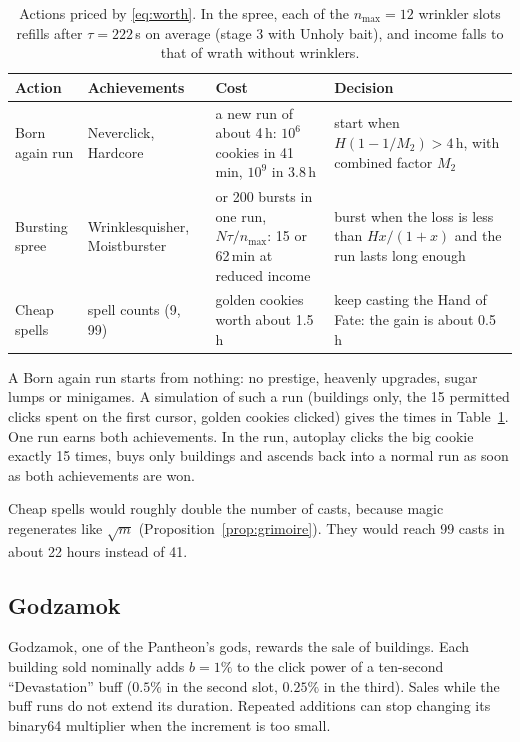 \documentclass[11pt,a4paper]{article}
\numberwithin{equation}{section}
\theoremstyle{definition}
\theoremstyle{remark}
\begin{document}
\begin{table}[t]
\centering
\small
\begin{tabular}{@{}>{\raggedright\arraybackslash}p{2.7cm}>{\raggedright\arraybackslash}p{3.1cm}>{\raggedright\arraybackslash}p{4.4cm}>{\raggedright\arraybackslash}p{4.1cm}@{}}
\toprule
Action & Achievements & Cost & Decision \\
\midrule
Born again run & Neverclick, Hardcore & a new run of about 4\,h: $10^6$ cookies in 41\,min, $10^9$ in 3.8\,h & start when $H(1-1/M_2)>4$\,h, with combined factor $M_2$ \\
\addlinespace
Bursting spree & Wrinklesquisher, Moistburster & 50 or 200 bursts in one run, $N\tau/n_{\max}$: 15 or 62\,min at reduced income & burst when the loss is less than $Hx/(1+x)$ and the run lasts long enough \\
\addlinespace
Cheap spells & spell counts (9, 99) & golden cookies worth about 1.5\,h & keep casting the Hand of Fate: the gain is about 0.5\,h \\
\bottomrule
\end{tabular}
\caption{Actions priced by \eqref{eq:worth}. In the spree, each of the $n_{\max}=12$ wrinkler slots refills after $\tau=222$\,s on average (stage 3 with Unholy bait), and income falls to that of wrath without wrinklers.}
\label{tab:actions}
\end{table}

A Born again run starts from nothing: no prestige, heavenly upgrades, sugar lumps or minigames. A simulation of such a run (buildings only, the 15 permitted clicks spent on the first cursor, golden cookies clicked) gives the times in Table~\ref{tab:actions}. One run earns both achievements. In the run, autoplay clicks the big cookie exactly 15 times, buys only buildings and ascends back into a normal run as soon as both achievements are won.

Cheap spells would roughly double the number of casts, because magic regenerates like $\sqrt m$ (Proposition~\ref{prop:grimoire}). They would reach 99 casts in about 22 hours instead of 41.

\subsection{Godzamok}\label{sec:godzamok}
Godzamok, one of the Pantheon's gods, rewards the sale of buildings. Each building sold nominally adds $b=1\%$ to the click power of a ten-second ``Devastation'' buff ($0.5\%$ in the second slot, $0.25\%$ in the third). Sales while the buff runs do not extend its duration. Repeated additions can stop changing its binary64 multiplier when the increment is too small.
\end{document}
